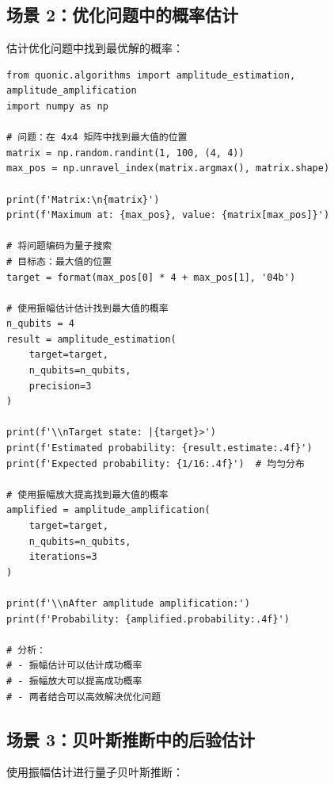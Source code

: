 \documentclass[12pt,a4paper]{article}
\begin{document}
\subsection{场景 2：优化问题中的概率估计}

估计优化问题中找到最优解的概率：

\begin{verbatim}
from quonic.algorithms import amplitude_estimation, amplitude_amplification
import numpy as np

# 问题：在 4x4 矩阵中找到最大值的位置
matrix = np.random.randint(1, 100, (4, 4))
max_pos = np.unravel_index(matrix.argmax(), matrix.shape)

print(f'Matrix:\n{matrix}')
print(f'Maximum at: {max_pos}, value: {matrix[max_pos]}')

# 将问题编码为量子搜索
# 目标态：最大值的位置
target = format(max_pos[0] * 4 + max_pos[1], '04b')

# 使用振幅估计估计找到最大值的概率
n_qubits = 4
result = amplitude_estimation(
    target=target,
    n_qubits=n_qubits,
    precision=3
)

print(f'\\nTarget state: |{target}>')
print(f'Estimated probability: {result.estimate:.4f}')
print(f'Expected probability: {1/16:.4f}')  # 均匀分布

# 使用振幅放大提高找到最大值的概率
amplified = amplitude_amplification(
    target=target,
    n_qubits=n_qubits,
    iterations=3
)

print(f'\\nAfter amplitude amplification:')
print(f'Probability: {amplified.probability:.4f}')

# 分析：
# - 振幅估计可以估计成功概率
# - 振幅放大可以提高成功概率
# - 两者结合可以高效解决优化问题
\end{verbatim}

\subsection{场景 3：贝叶斯推断中的后验估计}

使用振幅估计进行量子贝叶斯推断：
\end{document}
